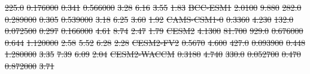 \documentclass[gmd, manuscript]{copernicus}
\providecommand{\DIFdel}[1]{{\protect\color{red}\sout{#1}}}                      %
\providecommand{\DIFdelFL}[1]{\DIFdel{#1}} %
\begin{document}
\begin{table}[t]
{\DIFdelFL{225.0 }%
\DIFdelFL{0.176000 }%
\DIFdelFL{0.341 }%
\DIFdelFL{0.566000 }%
\DIFdelFL{3.28 }%
\DIFdelFL{6.16 }%
\DIFdelFL{3.55 }%
\DIFdelFL{1.83 }%
\DIFdelFL{BCC-ESM1        }%
\DIFdelFL{2.0100 }%
\DIFdelFL{9.880 }%
\DIFdelFL{282.0 }%
\DIFdelFL{0.289000 }%
\DIFdelFL{0.305 }%
\DIFdelFL{0.539000 }%
\DIFdelFL{3.18 }%
\DIFdelFL{6.25 }%
\DIFdelFL{3.60 }%
\DIFdelFL{1.92 }%
\DIFdelFL{CAMS-CSM1-0     }%
\DIFdelFL{0.3360 }%
\DIFdelFL{4.230 }%
\DIFdelFL{132.0 }%
\DIFdelFL{0.072500 }%
\DIFdelFL{0.297 }%
\DIFdelFL{0.166000 }%
\DIFdelFL{4.61 }%
\DIFdelFL{8.74 }%
\DIFdelFL{2.47 }%
\DIFdelFL{1.79 }%
\DIFdelFL{CESM2           }%
\DIFdelFL{4.1300 }%
\DIFdelFL{81.700 }%
\DIFdelFL{929.0 }%
\DIFdelFL{0.676000 }%
\DIFdelFL{0.644 }%
\DIFdelFL{1.120000 }%
\DIFdelFL{2.58 }%
\DIFdelFL{5.52 }%
\DIFdelFL{6.28 }%
\DIFdelFL{2.28 }%
\DIFdelFL{CESM2-FV2       }%
\DIFdelFL{0.5670 }%
\DIFdelFL{4.600 }%
\DIFdelFL{427.0 }%
\DIFdelFL{0.093900 }%
\DIFdelFL{0.448 }%
\DIFdelFL{1.280000 }%
\DIFdelFL{3.35 }%
\DIFdelFL{7.39 }%
\DIFdelFL{6.09 }%
\DIFdelFL{2.04 }%
\DIFdelFL{CESM2-WACCM     }%
\DIFdelFL{0.3180 }%
\DIFdelFL{4.740 }%
\DIFdelFL{330.0 }%
\DIFdelFL{0.052700 }%
\DIFdelFL{0.470 }%
\DIFdelFL{0.872000 }%
\DIFdelFL{3.71 }%
}
\end{table}
\end{document}
